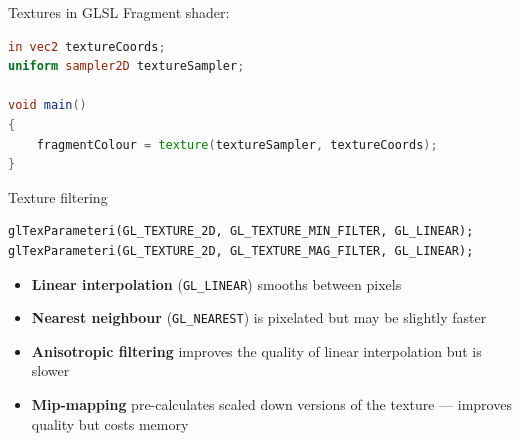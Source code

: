
\begin{frame}[fragile]{Textures in GLSL}
	Fragment shader:
	
	\begin{lstlisting}[language=GLSL]
in vec2 textureCoords;
uniform sampler2D textureSampler;

void main()
{
    fragmentColour = texture(textureSampler, textureCoords);
}
	\end{lstlisting}
\end{frame}

\begin{frame}[fragile]{Texture filtering}
	\pause
	\begin{lstlisting}
glTexParameteri(GL_TEXTURE_2D, GL_TEXTURE_MIN_FILTER, GL_LINEAR);
glTexParameteri(GL_TEXTURE_2D, GL_TEXTURE_MAG_FILTER, GL_LINEAR);
	\end{lstlisting}
	\begin{itemize}
		\pause\item \textbf{Linear interpolation} (\lstinline{GL_LINEAR})
			smooths between pixels
		\pause\item \textbf{Nearest neighbour} (\lstinline{GL_NEAREST})
			is pixelated but may be slightly faster
		\pause\item \textbf{Anisotropic filtering} improves the quality of linear interpolation
			but is slower
		\pause\item \textbf{Mip-mapping} pre-calculates scaled down versions of the texture ---
			improves quality but costs memory
	\end{itemize}
\end{frame}

